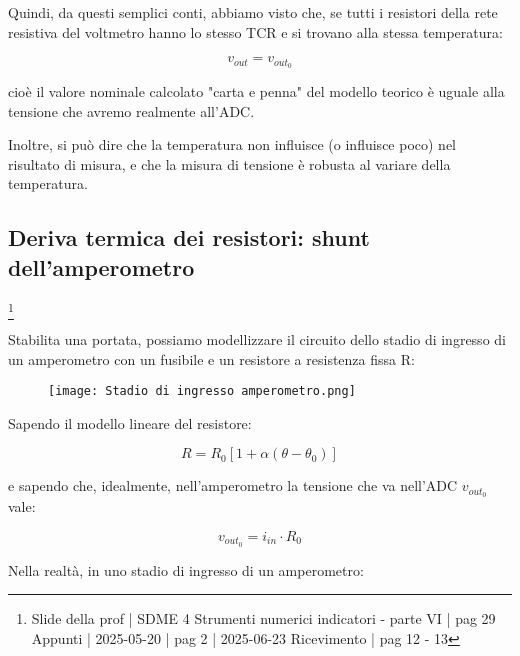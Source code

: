 Quindi, da questi semplici conti, abbiamo visto che, se tutti i resistori della rete resistiva del voltmetro hanno lo stesso TCR e si trovano alla stessa temperatura:

{
    \Large 
    \begin{equation}
        v_{out}
        = 
        v_{out_0}
    \end{equation}
}

cioè il valore nominale calcolato "carta e penna" del modello teorico è uguale alla tensione che avremo realmente all'ADC. \newline 

Inoltre, si può dire che la temperatura non influisce (o influisce poco) nel risultato di misura, 
e che la misura di tensione è robusta al variare della temperatura. \newline 

\newpage 

\subsection{Deriva termica dei resistori: shunt dell'amperometro}
\footnote{Slide della prof | SDME 4 Strumenti numerici indicatori - parte VI | pag 29 \\  
Appunti | 2025-05-20 | pag 2 | 2025-06-23 Ricevimento | pag 12 - 13} 

Stabilita una portata, possiamo modellizzare il circuito dello stadio di ingresso di un amperometro con un fusibile e un resistore a resistenza fissa R: 

\begin{figure}[h]
    \centering
    \texttt{[image: Stadio di ingresso amperometro.png]}
\end{figure}

Sapendo il modello lineare del resistore: 

{
    \Large 
    \begin{equation}
        R = R_0 [1 + \alpha (\theta - \theta_0)]
    \end{equation}
}

e sapendo che, idealmente, 
nell'amperometro la tensione che va nell'ADC $v_{out_0}$ vale: 

{
    \Large 
    \begin{equation}
        v_{out_0} 
        = 
        i_{in}
        \cdot 
        R_0
    \end{equation}
}


Nella realtà, in uno stadio di ingresso di un amperometro: 

